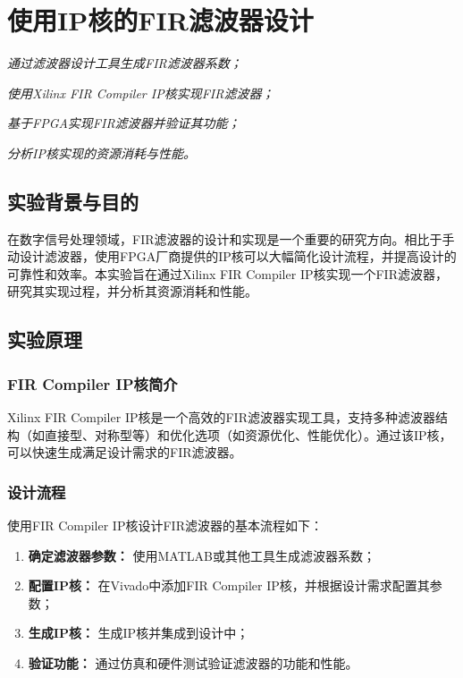 \chapter{使用IP核的FIR滤波器设计}
\begin{introduction}
    \item \textit{通过滤波器设计工具生成FIR滤波器系数；}
    \item \textit{使用Xilinx FIR Compiler IP核实现FIR滤波器；}
    \item \textit{基于FPGA实现FIR滤波器并验证其功能；}
    \item \textit{分析IP核实现的资源消耗与性能。}
\end{introduction}

\section{实验背景与目的}
在数字信号处理领域，FIR滤波器的设计和实现是一个重要的研究方向。相比于手动设计滤波器，使用FPGA厂商提供的IP核可以大幅简化设计流程，并提高设计的可靠性和效率。本实验旨在通过Xilinx FIR Compiler IP核实现一个FIR滤波器，研究其实现过程，并分析其资源消耗和性能。

\section{实验原理}
\subsection{FIR Compiler IP核简介}
Xilinx FIR Compiler IP核是一个高效的FIR滤波器实现工具，支持多种滤波器结构（如直接型、对称型等）和优化选项（如资源优化、性能优化）。通过该IP核，可以快速生成满足设计需求的FIR滤波器。

\subsection{设计流程}
使用FIR Compiler IP核设计FIR滤波器的基本流程如下：
\begin{enumerate}
    \item \textbf{确定滤波器参数：} 使用MATLAB或其他工具生成滤波器系数；
    \item \textbf{配置IP核：} 在Vivado中添加FIR Compiler IP核，并根据设计需求配置其参数；
    \item \textbf{生成IP核：} 生成IP核并集成到设计中；
    \item \textbf{验证功能：} 通过仿真和硬件测试验证滤波器的功能和性能。
\end{enumerate}
